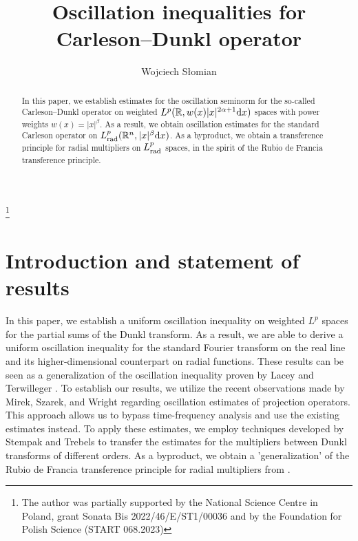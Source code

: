 \documentclass[11pt,oneside]{amsart}
\numberwithin{equation}{section}
\theoremstyle{definition}
\newcommand{\RR}{\mathbb{R}}
\begin{document}
\title{Oscillation inequalities for Carleson--Dunkl operator}


\author{Wojciech S{\l}omian}
\address[Wojciech S{\l}omian]{
	  Instytut Matematyczny,
        Uniwersytet Wroc{\l}awski,
        Plac Grunwaldzki 2,
        50-384 Wroc{\l}aw,
        Poland}

\thanks{The author was
partially supported by the National Science Centre in Poland, grant Sonata Bis 2022/46/E/ST1/00036 and by the Foundation for Polish Science (START 068.2023)}


\begin{abstract}
In this paper, we establish estimates for the oscillation seminorm for the so-called Carleson--Dunkl operator on weighted $L^p(\RR,w(x)|x|^{2\alpha+1}{\rm d}x)$ spaces with power weights $w(x)=|x|^\beta$. As a result, we obtain oscillation estimates for the standard Carleson operator on $L_{\rm rad}^p(\RR^n,|x|^\beta{\rm d}x)$. As a byproduct, we obtain a transference principle for radial multipliers on $L_{\rm rad}^p$ spaces, in the spirit of the Rubio de Francia transference principle.



\end{abstract}

\maketitle


\section{Introduction and statement of results}

In this paper, we establish a uniform oscillation inequality on weighted $L^p$ spaces for the partial sums of the Dunkl transform. As a result, we are able to derive a uniform oscillation inequality for the standard Fourier transform on the real line and its higher-dimensional counterpart on radial functions. These results can be seen as a generalization of the oscillation inequality proven by Lacey and Terwilleger \cite{LT}. To establish our results, we utilize the recent observations made by Mirek, Szarek, and Wright \cite{MSW} regarding oscillation estimates of projection operators. This approach allows us to bypass time-frequency analysis and use the existing estimates instead. To apply these estimates, we employ techniques developed by Stempak and Trebels \cite{StempakTrebels1997} to transfer the estimates for the multipliers between Dunkl transforms of different orders. As a byproduct, we obtain a 'generalization' of the Rubio de Francia transference principle for radial multipliers from \cite{RdF2}.
\end{document}
